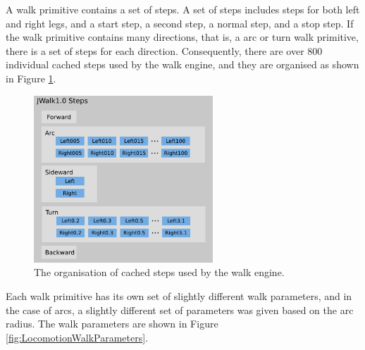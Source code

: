 A walk primitive contains a set of steps. A set of steps includes steps for both left and right legs, and a start step, a second step, a normal step, and a stop step. If the walk primitive contains many directions, that is, a arc or turn walk primitive, there is a set of steps for each direction. Consequently, there are over 800 individual cached steps used by the walk engine, and they are organised as shown in Figure \ref{fig:LocomotionSteps}.

\begin{figure}[tbh]
	\begin{center}
		\includegraphics[width=0.6\textwidth]{locomotionfigs/steps.png}
		\caption{The organisation of cached steps used by the walk engine.}
		\label{fig:LocomotionSteps}
	\end{center}
\end{figure}

Each walk primitive has its own set of slightly different walk parameters, and in the case of arcs, a slightly different set of parameters was given based on the arc radius. The walk parameters are shown in Figure \ref{fig:LocomotionWalkParameters}.

